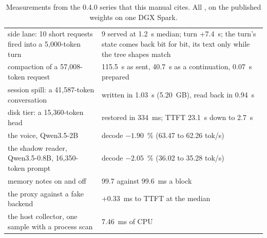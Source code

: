 \begin{table}[htbp]
\centering\small
\caption{Measurements from the 0.4.0 series that this manual cites. All \measured, on the published weights on one DGX Spark.}\label{tab:series-measurements}
\begin{tabularx}{\linewidth}{@{}YL{.36\linewidth}@{}}
\toprule
{} &  \\
\midrule
side lane: 10 short requests fired into a 5,000-token turn & 9 served at 1.2~s median; turn +7.4~s; the turn's state comes back bit for bit, its text only while the tree shapes match \\
compaction of a 57,008-token request & 115.5~s as sent, 40.7~s as a continuation, 0.07~s prepared \\
session spill: a 41,587-token conversation & written in 1.03~s (5.20~GB), read back in 0.94~s \\
disk tier: a 15,360-token head & restored in 334~ms; TTFT 23.1~s down to 2.7~s \\
the voice, Qwen3.5-2B & decode $-1.90$~\% (63.47 to 62.26 tok/s) \\
the shadow reader, Qwen3.5-0.8B, 16,350-token prompt & decode $-2.05$~\% (36.02 to 35.28 tok/s) \\
memory notes on and off & 99.7 against 99.6~ms a block \\
the proxy against a fake backend & +0.33~ms to TTFT at the median \\
the host collector, one sample with a process scan & 7.46~ms of CPU \\
\bottomrule
\end{tabularx}
\end{table}
